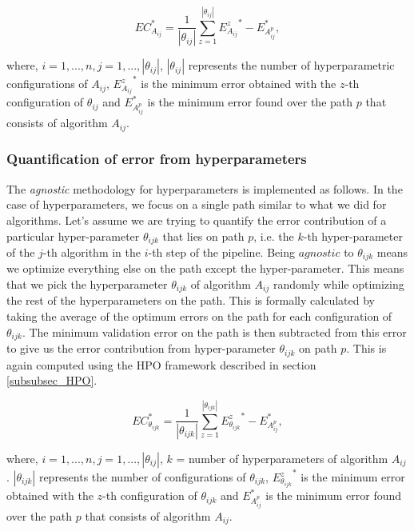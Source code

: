 \begin{equation}
\label{eq_alg}
EC_{A_{ij}}^* = \frac{1}{|\theta_{ij}|}\sum_{z=1}^{|\theta_{ij}|} {E_{A_{ij}}^z}^* - {E_{A_{ij}^p}^*},
\end{equation}

where, $i = {1, ..., n}, j = {1, ..., |\theta_{ij}|}$, $|\theta_{ij}|$ represents the number of hyperparametric configurations of $A_{ij}$,  ${E_{A_{ij}}^z}^*$ is the minimum error obtained with the $z$-th configuration of $\theta_{ij}$ and $E_{A_{ij}^p}^*$ is the minimum error found over the path $p$ that consists of algorithm $A_{ij}$.


\subsubsection{Quantification of error from hyperparameters}
\label{subsubsec_eq_hyper}
The \textit{agnostic} methodology for hyperparameters is implemented as follows. In the case of hyperparameters, we focus on a single path similar to what we did for algorithms. Let's assume we are trying to quantify the error contribution of a particular hyper-parameter $\theta_{ijk}$ that lies on path $p$, i.e. the $k$-th hyper-parameter of the $j$-th algorithm in the $i$-th step of the pipeline. Being $agnostic$ to $\theta_{ijk}$ means we optimize everything else on the path except the hyper-parameter. This means that we pick the hyperparameter $\theta_{ijk}$ of algorithm $A_{ij}$ randomly while optimizing the rest of the hyperparameters on the path. This is formally calculated by taking the average of the optimum errors on the path for each configuration of $\theta_{ijk}$. The minimum validation error on the path is then subtracted from this error to give us the error contribution from hyper-parameter $\theta_{ijk}$ on path $p$. This is again computed using the HPO framework described in section \ref{subsubsec_HPO}.

\begin{equation}
\label{eq_hyper}
EC_{\theta_{ijk}}^* = \frac{1}{|\theta_{ijk}|}\sum_{z=1}^{|\theta_{ijk}|} {E_{\theta_{ijk}}^z}^* - {E_{A_{ij}^p}^*},
\end{equation}

where, $i = {1, ..., n}, j = {1, ..., |\theta_{ij}|}$, $k$ = number of hyperparameters of algorithm $A_{ij}$. $|\theta_{ijk}|$ represents the number of configurations of $\theta_{ijk}$,  ${E_{\theta_{ijk}}^z}^*$ is the minimum error obtained with the $z$-th configuration of $\theta_{ijk}$ and $E_{A_{ij}^p}^*$ is the minimum error found over the path $p$ that consists of algorithm $A_{ij}$.


